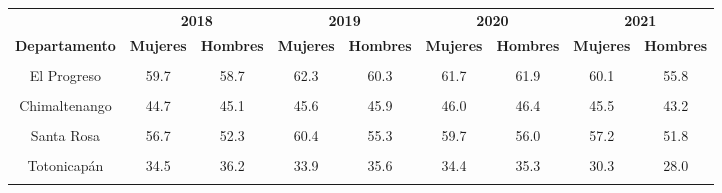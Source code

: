 \begin{tabular}[t]{ccccccccc}
\toprule
\multicolumn{1}{c}{\textbf{ }} & \multicolumn{2}{c}{\textbf{2018}} & \multicolumn{2}{c}{\textbf{2019}} & \multicolumn{2}{c}{\textbf{2020}} & \multicolumn{2}{c}{\textbf{2021}} \\
\cmidrule(l{3pt}r{3pt}){2-3} \cmidrule(l{3pt}r{3pt}){4-5} \cmidrule(l{3pt}r{3pt}){6-7} \cmidrule(l{3pt}r{3pt}){8-9}
\textbf{Departamento} & \textbf{Mujeres} & \textbf{Hombres} & \textbf{Mujeres} & \textbf{Hombres} & \textbf{Mujeres} & \textbf{Hombres} & \textbf{Mujeres} & \textbf{Hombres}\\
\midrule
\cellcolor[HTML]{B6B3FF}{Guatemala} & \cellcolor[HTML]{B6B3FF}{83.4} & \cellcolor[HTML]{B6B3FF}{81.7} & \cellcolor[HTML]{B6B3FF}{86.7} & \cellcolor[HTML]{B6B3FF}{84.4} & \cellcolor[HTML]{B6B3FF}{84.6} & \cellcolor[HTML]{B6B3FF}{82.4} & \cellcolor[HTML]{B6B3FF}{78.5} & \cellcolor[HTML]{B6B3FF}{74.2}\\
El Progreso & 59.7 & 58.7 & 62.3 & 60.3 & 61.7 & 61.9 & 60.1 & 55.8\\
\cellcolor[HTML]{B6B3FF}{Sacatepéquez} & \cellcolor[HTML]{B6B3FF}{63.5} & \cellcolor[HTML]{B6B3FF}{62.7} & \cellcolor[HTML]{B6B3FF}{66.8} & \cellcolor[HTML]{B6B3FF}{65.0} & \cellcolor[HTML]{B6B3FF}{66.8} & \cellcolor[HTML]{B6B3FF}{63.2} & \cellcolor[HTML]{B6B3FF}{64.3} & \cellcolor[HTML]{B6B3FF}{59.4}\\
Chimaltenango & 44.7 & 45.1 & 45.6 & 45.9 & 46.0 & 46.4 & 45.5 & 43.2\\
\cellcolor[HTML]{B6B3FF}{Escuintla} & \cellcolor[HTML]{B6B3FF}{54.3} & \cellcolor[HTML]{B6B3FF}{54.4} & \cellcolor[HTML]{B6B3FF}{58.7} & \cellcolor[HTML]{B6B3FF}{58.9} & \cellcolor[HTML]{B6B3FF}{57.8} & \cellcolor[HTML]{B6B3FF}{58.9} & \cellcolor[HTML]{B6B3FF}{54.8} & \cellcolor[HTML]{B6B3FF}{53.9}\\
Santa Rosa & 56.7 & 52.3 & 60.4 & 55.3 & 59.7 & 56.0 & 57.2 & 51.8\\
\cellcolor[HTML]{B6B3FF}{Sololá} & \cellcolor[HTML]{B6B3FF}{46.5} & \cellcolor[HTML]{B6B3FF}{45.9} & \cellcolor[HTML]{B6B3FF}{46.2} & \cellcolor[HTML]{B6B3FF}{45.7} & \cellcolor[HTML]{B6B3FF}{46.3} & \cellcolor[HTML]{B6B3FF}{45.1} & \cellcolor[HTML]{B6B3FF}{43.7} & \cellcolor[HTML]{B6B3FF}{41.0}\\
Totonicapán & 34.5 & 36.2 & 33.9 & 35.6 & 34.4 & 35.3 & 30.3 & 28.0\\
\cellcolor[HTML]{B6B3FF}{Quetzaltenango} & \cellcolor[HTML]{B6B3FF}{51.4} & \cellcolor[HTML]{B6B3FF}{54.1} & \cellcolor[HTML]{B6B3FF}{52.8} & \cellcolor[HTML]{B6B3FF}{54.8} & \cellcolor[HTML]{B6B3FF}{54.2} & \cellcolor[HTML]{B6B3FF}{56.2} & \cellcolor[HTML]{B6B3FF}{52.3} & \cellcolor[HTML]{B6B3FF}{52.2}\\

\end{tabular}
